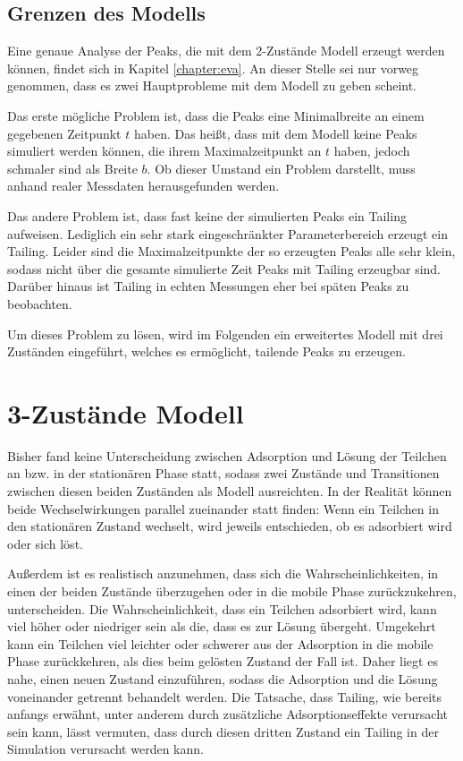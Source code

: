 \subsection{Grenzen des Modells}
Eine genaue Analyse der Peaks, die mit dem 2-Zustände Modell erzeugt werden können, findet sich in Kapitel \ref{chapter:eva}. An dieser Stelle sei nur vorweg genommen, dass es zwei Hauptprobleme mit dem Modell zu geben scheint. 

Das erste mögliche Problem ist, dass die Peaks eine Minimalbreite an einem gegebenen Zeitpunkt $t$ haben. Das heißt, dass mit dem Modell keine Peaks simuliert werden können, die ihrem Maximalzeitpunkt an $t$ haben, jedoch schmaler sind als Breite $b$. Ob dieser Umstand ein Problem darstellt, muss anhand realer Messdaten herausgefunden werden.

Das andere Problem ist, dass fast keine der simulierten Peaks ein Tailing aufweisen. Lediglich ein sehr stark eingeschränkter Parameterbereich erzeugt ein Tailing. Leider sind die Maximalzeitpunkte der so erzeugten Peaks alle sehr klein, sodass nicht über die gesamte simulierte Zeit Peaks mit Tailing erzeugbar sind. Darüber hinaus ist Tailing in echten Messungen eher bei späten Peaks zu beobachten.

Um dieses Problem zu lösen, wird im Folgenden ein erweitertes Modell mit drei Zuständen eingeführt, welches es ermöglicht, tailende Peaks zu erzeugen.


\section{3-Zustände Modell} 
\label{chapter:mod:3s}


Bisher fand keine Unterscheidung zwischen Adsorption und Lösung der Teilchen an bzw. in der stationären Phase statt, sodass zwei Zustände und Transitionen zwischen diesen beiden Zuständen als Modell ausreichten. In der Realität können beide Wechselwirkungen parallel zueinander statt finden: Wenn ein Teilchen in den stationären Zustand wechselt, wird jeweils entschieden, ob es adsorbiert wird oder sich löst.

Außerdem ist es realistisch anzunehmen, dass sich die Wahrscheinlichkeiten, in einen der beiden Zustände überzugehen oder in die mobile Phase zurückzukehren, unterscheiden. Die Wahrscheinlichkeit, dass ein Teilchen adsorbiert wird, kann viel höher oder niedriger sein als die, dass es zur Lösung übergeht. Umgekehrt kann ein Teilchen viel leichter oder schwerer aus der Adsorption in die mobile Phase zurückkehren, als dies beim gelösten Zustand der Fall ist. Daher liegt es nahe, einen neuen Zustand einzuführen, sodass die Adsorption und die Lösung voneinander getrennt behandelt werden. Die Tatsache, dass Tailing, wie bereits anfangs erwähnt, unter anderem durch zusätzliche Adsorptionseffekte verursacht sein kann, lässt vermuten, dass durch diesen dritten Zustand ein Tailing in der Simulation verursacht werden kann. 
 

